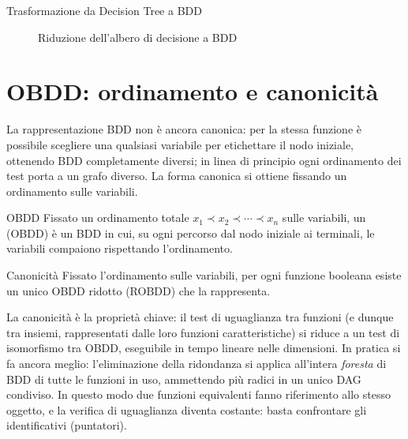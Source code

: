\begin{example}{Trasformazione da Decision Tree a BDD}
\begin{figure}[H]
\begin{minipage}{0.3\textwidth}
  \end{minipage}
  \caption{Riduzione dell'albero di decisione a BDD}
  \end{figure}
\end{example}

\section{OBDD: ordinamento e canonicità}

La rappresentazione BDD non è ancora canonica: per la stessa funzione è possibile scegliere una qualsiasi variabile per etichettare il nodo iniziale, ottenendo BDD completamente diversi; in linea di principio ogni ordinamento dei test porta a un grafo diverso. La forma canonica si ottiene fissando un ordinamento sulle variabili.

\begin{definition}{OBDD}
  Fissato un ordinamento totale \(x_1 \prec x_2 \prec \cdots \prec x_n\) sulle variabili, un  (OBDD) è un BDD in cui, su ogni percorso dal nodo iniziale ai terminali, le variabili compaiono rispettando l'ordinamento.
\end{definition}

\begin{theorem}{Canonicità}
  Fissato l'ordinamento sulle variabili, per ogni funzione booleana esiste un unico OBDD ridotto (ROBDD) che la rappresenta.
\end{theorem}

La canonicità è la proprietà chiave: il test di uguaglianza tra funzioni (e dunque tra insiemi, rappresentati dalle loro funzioni caratteristiche) si riduce a un test di isomorfismo tra OBDD, eseguibile in tempo lineare nelle dimensioni. In pratica si fa ancora meglio: l'eliminazione della ridondanza si applica all'intera \emph{foresta} di BDD di tutte le funzioni in uso, ammettendo più radici in un unico DAG condiviso. In questo modo due funzioni equivalenti fanno riferimento allo stesso oggetto, e la verifica di uguaglianza diventa costante: basta confrontare gli identificativi (puntatori).

